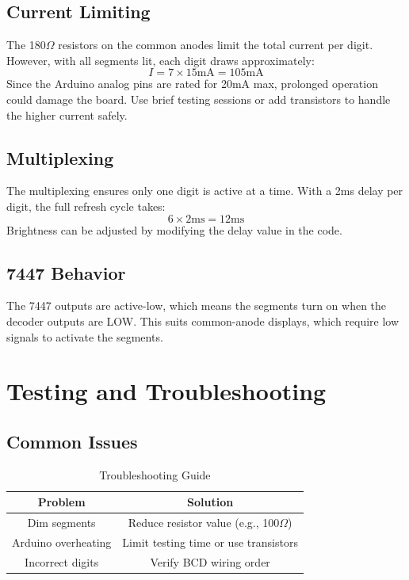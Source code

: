 \documentclass[journal]{IEEEtran}
\begin{document}
\subsection{Current Limiting}
The 180$\Omega$ resistors on the common anodes limit the total current per digit. However, with all segments lit, each digit draws approximately:
\[
I = 7 \times 15\text{mA} = 105\text{mA}
\]
Since the Arduino analog pins are rated for 20mA max, prolonged operation could damage the board. Use brief testing sessions or add transistors to handle the higher current safely.

\subsection{Multiplexing}
The multiplexing ensures only one digit is active at a time. With a 2ms delay per digit, the full refresh cycle takes:
\[
6 \times 2\text{ms} = 12\text{ms}
\]
Brightness can be adjusted by modifying the delay value in the code.

\subsection{7447 Behavior}
The 7447 outputs are active-low, which means the segments turn on when the decoder outputs are LOW. This suits common-anode displays, which require low signals to activate the segments.

\section{Testing and Troubleshooting}

\subsection{Common Issues}
\begin{table}[H]
    \centering
    \caption{Troubleshooting Guide}
    \begin{tabular}{|c|c|}
        \hline
        \textbf{Problem} & \textbf{Solution} \\
        \hline
        Dim segments & Reduce resistor value (e.g., 100$\Omega$) \\
        Arduino overheating & Limit testing time or use transistors \\
        Incorrect digits & Verify BCD wiring order \\
        \hline
    \end{tabular}
\end{table}
\end{document}
